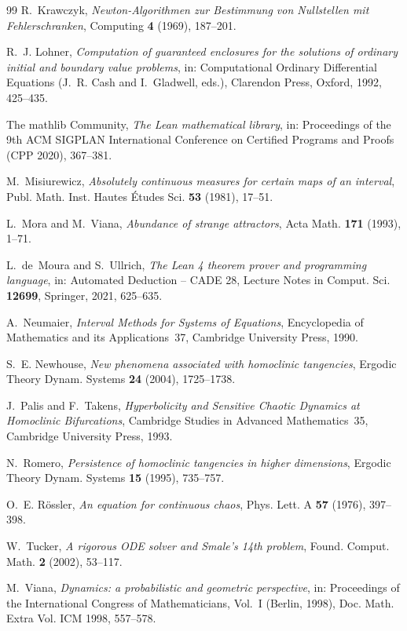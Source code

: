 \documentclass[11pt]{amsart}
\theoremstyle{definition}
\theoremstyle{remark}
\begin{document}
\begin{thebibliography}{99}
R.~Krawczyk,
\emph{Newton-Algorithmen zur Bestimmung von Nullstellen mit Fehlerschranken},
Computing \textbf{4} (1969), 187--201.

R.~J. Lohner,
\emph{Computation of guaranteed enclosures for the solutions of ordinary initial and boundary value problems},
in: Computational Ordinary Differential Equations (J.~R. Cash and I.~Gladwell, eds.), Clarendon Press, Oxford,
1992, 425--435.

The mathlib Community,
\emph{The Lean mathematical library},
in: Proceedings of the 9th ACM SIGPLAN International Conference on Certified Programs and Proofs (CPP 2020),
367--381.

M.~Misiurewicz,
\emph{Absolutely continuous measures for certain maps of an interval},
Publ. Math. Inst. Hautes \'Etudes Sci. \textbf{53} (1981), 17--51.

L.~Mora and M.~Viana,
\emph{Abundance of strange attractors},
Acta Math. \textbf{171} (1993), 1--71.

L.~de~Moura and S.~Ullrich,
\emph{The Lean 4 theorem prover and programming language},
in: Automated Deduction -- CADE 28, Lecture Notes in Comput. Sci. \textbf{12699}, Springer, 2021, 625--635.

A.~Neumaier,
\emph{Interval Methods for Systems of Equations},
Encyclopedia of Mathematics and its Applications~37, Cambridge University Press, 1990.

S.~E. Newhouse,
\emph{New phenomena associated with homoclinic tangencies},
Ergodic Theory Dynam. Systems \textbf{24} (2004), 1725--1738.

J.~Palis and F.~Takens,
\emph{Hyperbolicity and Sensitive Chaotic Dynamics at Homoclinic Bifurcations},
Cambridge Studies in Advanced Mathematics~35, Cambridge University Press, 1993.

N.~Romero,
\emph{Persistence of homoclinic tangencies in higher dimensions},
Ergodic Theory Dynam. Systems \textbf{15} (1995), 735--757.

O.~E. R\"ossler,
\emph{An equation for continuous chaos},
Phys. Lett. A \textbf{57} (1976), 397--398.

W.~Tucker,
\emph{A rigorous ODE solver and Smale's 14th problem},
Found. Comput. Math. \textbf{2} (2002), 53--117.

M.~Viana,
\emph{Dynamics: a probabilistic and geometric perspective},
in: Proceedings of the International Congress of Mathematicians, Vol.~I (Berlin, 1998),
Doc. Math. Extra Vol. ICM 1998, 557--578.


\end{thebibliography}
\end{document}
